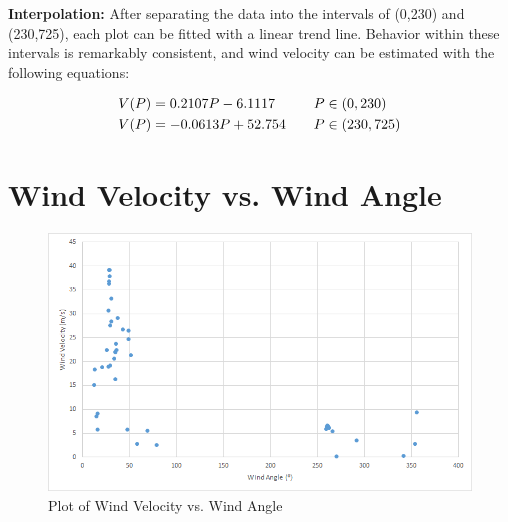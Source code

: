 \documentclass{article}
\begin{document}
\begin{flushleft}
\textbf{Interpolation:} After separating the data into the intervals of (0,230) and (230,725), each plot can be fitted with a linear trend line.  Behavior within these intervals is remarkably consistent, and wind velocity can be estimated with the following equations:
\end{flushleft}

\begin{align*}
\centering
    V(P) &= 0.2107P - 6.1117&& \text{\quad $P\in(0,230)$} \\
    V(P) &= -0.0613P + 52.754 && \text{\quad $P\in(230,725)$} \\
\end{align*}
\part{Wind Velocity vs. Wind Angle}
\begin{figure}[H]
  \centering
  \includegraphics[width=\textwidth]{alan-data.png}
  \caption{Plot of Wind Velocity vs. Wind Angle}
\end{figure}
\end{document}

